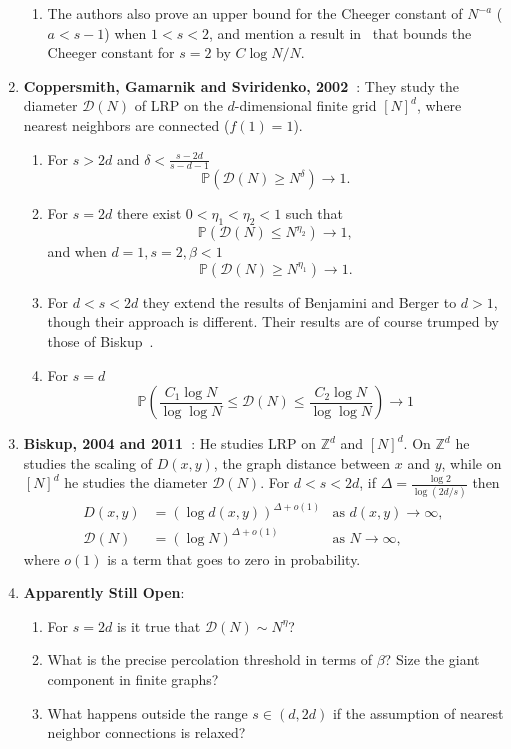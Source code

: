 \documentclass[11pt,letterpaper]{article}
\newcommand{\prob}[1]{\mathbb{P}\left(#1\right)}
\newcommand{\D}{\mathcal{D}}
\begin{document}
\begin{enumerate}
\begin{enumerate}
\item The authors also prove an upper bound for the Cheeger constant of $N^{-a}$ ($a<s-1$) when $1<s<2$, and mention a result in~\cite{Berger:2002} that bounds the Cheeger constant for $s=2$ by $C\log N / N$.
\end{enumerate}

\item {\bf Coppersmith, Gamarnik and Sviridenko, 2002~\cite{CGS:2002}}: They study the diameter $\D(N)$ of LRP on the $d$-dimensional finite grid $[N]^d$, where nearest neighbors are connected ($f(1)=1$).

\begin{enumerate}
\item For $s>2d$ and $\delta < \frac{s-2d}{s-d-1}$
$$\prob{\D(N) \geq N^\delta} \to 1.$$

\item For $s = 2d$ there exist $0<\eta_1<\eta_2<1$ such that
$$ \prob{\D(N) \leq N^{\eta_2}} \to 1,$$
and when $d=1, s=2, \beta<1$
$$ \prob{\D(N) \geq N^{\eta_1}}\to 1.$$

\item For $d<s<2d$ they extend the results of Benjamini and Berger to $d>1$, though their approach is different.  Their results are of course trumped by those of Biskup~\cite{Biskup:2004}.

\item For $s=d$
$$ \prob{\frac{C_1 \log N}{\log \log N} \leq \D(N) \leq \frac{C_2 \log N}{\log \log N}} \to 1$$

\end{enumerate}

\item {\bf Biskup, 2004 and 2011~\cite{Biskup:2004, Biskup:2011}}: He studies LRP on $\mathbb{Z}^d$ and $[N]^d$.  On $\mathbb{Z}^d$ he studies the scaling of $D(x,y)$, the graph distance between $x$ and $y$, while on $[N]^d$ he studies the diameter $\D(N)$.  For $d<s<2d$, if $\Delta = \frac{\log 2}{\log(2d/s)}$ then
\begin{align*}
D(x,y) &= (\log d(x,y))^{\Delta + o(1)}  &\text{as } d(x,y) \to \infty,\\
\D(N) &= (\log N)^{\Delta + o(1)} &\text{as } N \to \infty,
\end{align*}
where $o(1)$ is a term that goes to zero in probability.


\item {\bf Apparently Still Open}: 
\begin{enumerate}
\item For $s=2d$ is it true that $\D(N) \sim N^{\eta}$?
\item What is the precise percolation threshold in terms of $\beta$?  Size the giant component in finite graphs?
\item What happens outside the range $s\in (d,2d)$ if the assumption of nearest neighbor connections is relaxed?
\end{enumerate}

\end{enumerate}



\end{document}
